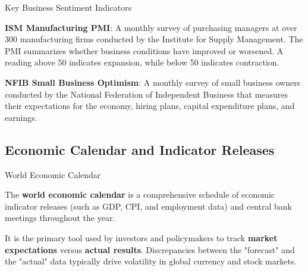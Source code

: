 \documentclass[10pt]{article}
\begin{document}
    \begin{core}{Key Business Sentiment Indicators}

      \textbf{ISM Manufacturing PMI}: A monthly survey of purchasing managers at over 300 manufacturing firms conducted by the Institute for Supply Management. The PMI summarizes whether business conditions have improved or worsened. A reading above 50 indicates expansion, while below 50 indicates contraction.

      \textbf{NFIB Small Business Optimism}: A monthly survey of small business owners conducted by the National Federation of Independent Business that measures their expectations for the economy, hiring plans, capital expenditure plans, and earnings.

    \end{core}

  \subsection{Economic Calendar and Indicator Releases}

    \begin{core}{World Economic Calendar}

      The \textbf{world economic calendar} is a comprehensive schedule of economic indicator releases (such as GDP, CPI, and employment data) and central bank meetings throughout the year. 

      It is the primary tool used by investors and policymakers to track \textbf{market expectations} versus \textbf{actual results}. Discrepancies between the "forecast" and the "actual" data typically drive volatility in global currency and stock markets.

    \end{core}    
\end{document}
